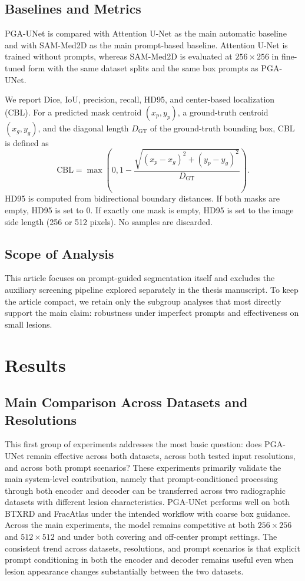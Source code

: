 \documentclass{ieeeaccess}
\begin{document}
\subsection{Baselines and Metrics}
PGA-UNet is compared with Attention U-Net \cite{b4} as the main automatic baseline and with SAM-Med2D \cite{b2} as the main prompt-based baseline. Attention U-Net is trained without prompts, whereas SAM-Med2D is evaluated at $256\times256$ in fine-tuned form with the same dataset splits and the same box prompts as PGA-UNet.

We report Dice, IoU, precision, recall, HD95, and center-based localization (CBL). For a predicted mask centroid $(x_p,y_p)$, a ground-truth centroid $(x_g,y_g)$, and the diagonal length $D_{\mathrm{GT}}$ of the ground-truth bounding box, CBL is defined as
\begin{equation}
\mathrm{CBL}=\max\left(0,1-\frac{\sqrt{(x_p-x_g)^2+(y_p-y_g)^2}}{D_{\mathrm{GT}}}\right).
\end{equation}
HD95 is computed from bidirectional boundary distances. If both masks are empty, HD95 is set to 0. If exactly one mask is empty, HD95 is set to the image side length (256 or 512 pixels). No samples are discarded.

\subsection{Scope of Analysis}
This article focuses on prompt-guided segmentation itself and excludes the auxiliary screening pipeline explored separately in the thesis manuscript. To keep the article compact, we retain only the subgroup analyses that most directly support the main claim: robustness under imperfect prompts and effectiveness on small lesions.

\section{Results}
\subsection{Main Comparison Across Datasets and Resolutions}
This first group of experiments addresses the most basic question: does PGA-UNet remain effective across both datasets, across both tested input resolutions, and across both prompt scenarios? These experiments primarily validate the main system-level contribution, namely that prompt-conditioned processing through both encoder and decoder can be transferred across two radiographic datasets with different lesion characteristics. PGA-UNet performs well on both BTXRD and FracAtlas under the intended workflow with coarse box guidance. Across the main experiments, the model remains competitive at both $256\times256$ and $512\times512$ and under both covering and off-center prompt settings. The consistent trend across datasets, resolutions, and prompt scenarios is that explicit prompt conditioning in both the encoder and decoder remains useful even when lesion appearance changes substantially between the two datasets.
\end{document}
